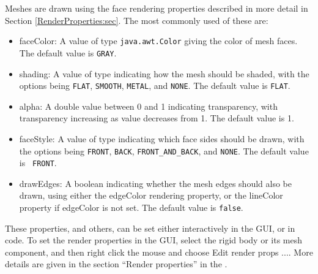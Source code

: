 Meshes are drawn using the face rendering properties described in more
detail in Section \ref{RenderProperties:sec}. The most commonly used
of these are:

\begin{itemize}

\item {\sf faceColor}: A value of type {\tt java.awt.Color} giving the
color of mesh faces. The default value is {\tt GRAY}.

\item {\sf shading}: A value of type
 indicating how the mesh
should be shaded, with the options being {\tt FLAT}, {\tt SMOOTH},
{\tt METAL}, and {\tt NONE}.  The default value is {\tt FLAT}.

\item {\sf alpha}: A double value between 0 and 1 indicating
transparency, with transparency increasing as value decreases from 1.
The default value is 1.

\item {\sf faceStyle}: A value of type
 indicating which face
sides should be drawn, with the options being {\tt FRONT}, {\tt BACK},
{\tt FRONT\_AND\_BACK}, and {\tt NONE}.  The default value is {\tt
FRONT}.

\item {\sf drawEdges}: A boolean indicating whether the mesh edges
should also be drawn, using either the {\sf edgeColor} rendering
property, or the {\sf lineColor} property if {\sf edgeColor} is not
set. The default value is {\tt false}.

\end{itemize}

These properties, and others, can be set either interactively in the
GUI, or in code. To set the render properties in the GUI, select the
rigid body or its mesh component, and then right click the mouse and
choose {\sf Edit render props ...}. More details are given in the
section ``Render properties'' in the .

